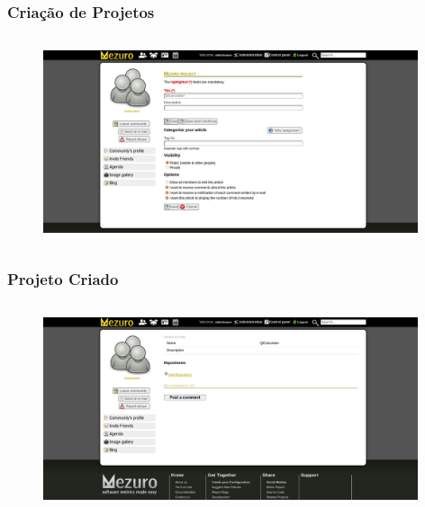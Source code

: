 \documentclass{beamer}
\begin{document}
    \begin{frame}
      \frametitle{Criação de Projetos}
      \framesubtitle{}
    
      \begin{figure}
        \begin{center}
          \includegraphics[width=11cm, height=6cm]{images/05-project-creation.png}
          \label{fig:project-creation}
        \end{center}
      \end{figure}
    \end{frame}
    
    \begin{frame}
      \frametitle{Projeto Criado}
      \framesubtitle{}
    
      \begin{figure}
        \begin{center}
          \includegraphics[width=11cm, height=6cm]{images/06-project-created.png}
          \label{fig:project-created}
        \end{center}
      \end{figure}
    \end{frame}
    
\end{document}
